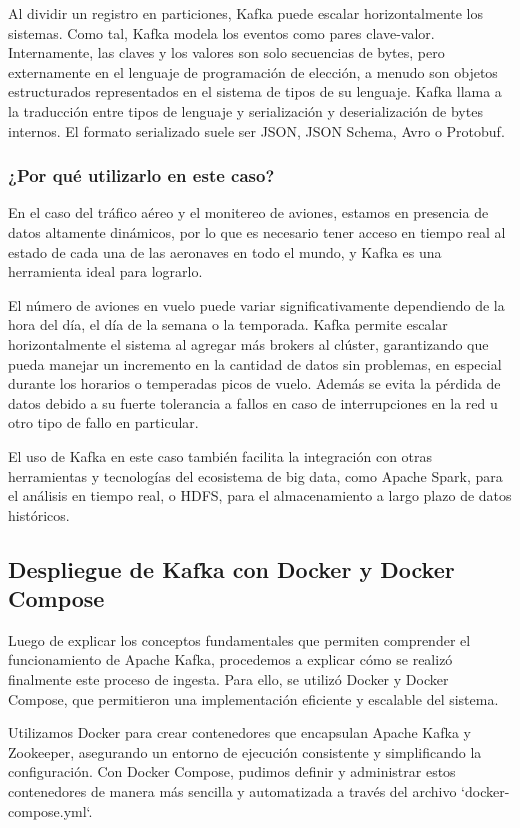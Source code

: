 \documentclass{article}
\begin{document}
Al dividir un registro en particiones, Kafka puede escalar horizontalmente los sistemas. Como tal, Kafka modela los eventos como pares clave-valor. Internamente, las claves y los valores son solo secuencias de bytes, pero externamente en el lenguaje de programación de elección, a menudo son objetos estructurados representados en el sistema de tipos de su lenguaje. Kafka llama a la traducción entre tipos de lenguaje y serialización y deserialización de bytes internos. El formato serializado suele ser JSON, JSON Schema, Avro o Protobuf.

\subsubsection{¿Por qué utilizarlo en este caso?}

En el caso del tráfico aéreo y el monitereo de aviones, estamos en presencia de datos altamente dinámicos, por lo que es necesario tener acceso en tiempo real al estado de cada una de las aeronaves en todo el mundo, y Kafka es una herramienta ideal para lograrlo.

El número de aviones en vuelo puede variar significativamente dependiendo de la hora del día, el día de la semana o la temporada. Kafka permite escalar horizontalmente el sistema al agregar más brokers al clúster, garantizando que pueda manejar un incremento en la cantidad de datos sin problemas, en especial durante los horarios o temperadas picos de vuelo. Además se evita la pérdida de datos debido a su fuerte tolerancia a fallos en caso de interrupciones en la red u otro tipo de fallo en particular.

El uso de Kafka en este caso también facilita la integración con otras herramientas y tecnologías del ecosistema de big data, como Apache Spark, para el análisis en tiempo real, o HDFS, para el almacenamiento a largo plazo de datos históricos.

\subsection{Despliegue de Kafka con Docker y Docker Compose}

Luego de explicar los conceptos fundamentales que permiten comprender el funcionamiento de Apache Kafka, procedemos a explicar cómo se realizó finalmente este proceso de ingesta. Para ello, se utilizó Docker y Docker Compose, que permitieron una implementación eficiente y escalable del sistema.

Utilizamos Docker para crear contenedores que encapsulan Apache Kafka y Zookeeper, asegurando un entorno de ejecución consistente y simplificando la configuración. Con Docker Compose, pudimos definir y administrar estos contenedores de manera más sencilla y automatizada a través del archivo `docker-compose.yml`.
\end{document}
